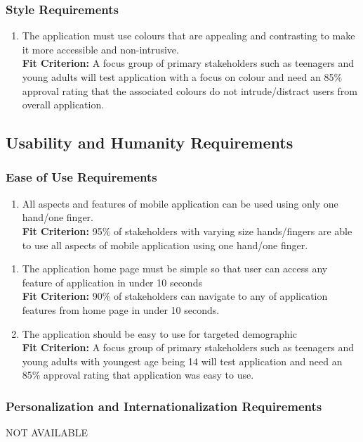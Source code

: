 \documentclass[12pt,letterpaper]{article}
\begin{document}
\subsubsection{Style Requirements}
\begin{enumerate}[resume*]  
    \item The application must use colours that are appealing and contrasting to make it more accessible and non-intrusive.\\
    {\textbf{Fit Criterion:} A focus group of primary stakeholders such as teenagers and young adults will test application with a focus on colour and need an 85\% approval rating that the associated colours do not intrude/distract users from overall application.}
\end{enumerate}

\subsection{Usability and Humanity Requirements}
\subsubsection{Ease of Use Requirements}
\begin{enumerate}[{UH}1.] 
    \item All aspects and features of mobile application can be used using only one hand/one finger.\\
    {\textbf{Fit Criterion:} 95\% of stakeholders with varying size hands/fingers are able to use all aspects of mobile application using one hand/one finger.}
\end{enumerate}
\begin{enumerate}[resume*]  
    \item The application home page must be simple so that user can access any feature of application in under 10 seconds\\
    {\textbf{Fit Criterion:} 90\% of stakeholders can navigate to any of application features from home page in under 10 seconds. }
    \item The application should be easy to use for targeted demographic\\
    {\textbf{Fit Criterion:} A focus group of primary stakeholders such as teenagers and young adults with youngest age being 14 will test application and need an 85\% approval rating that application was easy to use. }
\end{enumerate}

\subsubsection{Personalization and Internationalization Requirements}
\noindent NOT AVAILABLE
\end{document}
